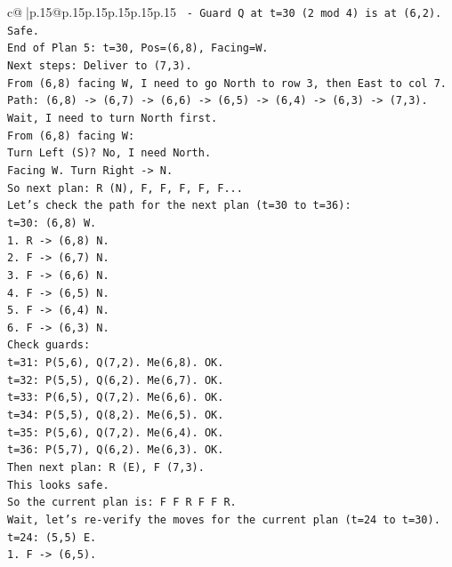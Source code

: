 \documentclass{article}
\begin{document}
{\begin{supertabular}{c@{$\;$}|p{.15\linewidth}@{}p{.15\linewidth}p{.15\linewidth}p{.15\linewidth}p{.15\linewidth}p{.15\linewidth}}
{{{\texttt{  {-} Guard Q at t=30 (2 mod 4) is at (6,2). Safe.} \\
\texttt{End of Plan 5: t=30, Pos=(6,8), Facing=W.} \\
\texttt{Next steps: Deliver to (7,3).} \\
\texttt{From (6,8) facing W, I need to go North to row 3, then East to col 7.} \\
\texttt{Path: (6,8) {-}> (6,7) {-}> (6,6) {-}> (6,5) {-}> (6,4) {-}> (6,3) {-}> (7,3).} \\
\texttt{Wait, I need to turn North first.} \\
\texttt{From (6,8) facing W:} \\
\texttt{Turn Left (S)? No, I need North.} \\
\texttt{Facing W. Turn Right {-}> N.} \\
\texttt{So next plan: R (N), F, F, F, F, F...} \\
\texttt{Let's check the path for the next plan (t=30 to t=36):} \\
\texttt{t=30: (6,8) W.} \\
\texttt{1. R {-}> (6,8) N.} \\
\texttt{2. F {-}> (6,7) N.} \\
\texttt{3. F {-}> (6,6) N.} \\
\texttt{4. F {-}> (6,5) N.} \\
\texttt{5. F {-}> (6,4) N.} \\
\texttt{6. F {-}> (6,3) N.} \\
\texttt{Check guards:} \\
\texttt{t=31: P(5,6), Q(7,2). Me(6,8). OK.} \\
\texttt{t=32: P(5,5), Q(6,2). Me(6,7). OK.} \\
\texttt{t=33: P(6,5), Q(7,2). Me(6,6). OK.} \\
\texttt{t=34: P(5,5), Q(8,2). Me(6,5). OK.} \\
\texttt{t=35: P(5,6), Q(7,2). Me(6,4). OK.} \\
\texttt{t=36: P(5,7), Q(6,2). Me(6,3). OK.} \\
\texttt{Then next plan: R (E), F (7,3).} \\
\texttt{This looks safe.} \\
\texttt{So the current plan is: F F R F F R.} \\
\texttt{Wait, let's re{-}verify the moves for the current plan (t=24 to t=30).} \\
\texttt{t=24: (5,5) E.} \\
\texttt{1. F {-}> (6,5).} \\
}}}
\end{supertabular}}
\end{document}
